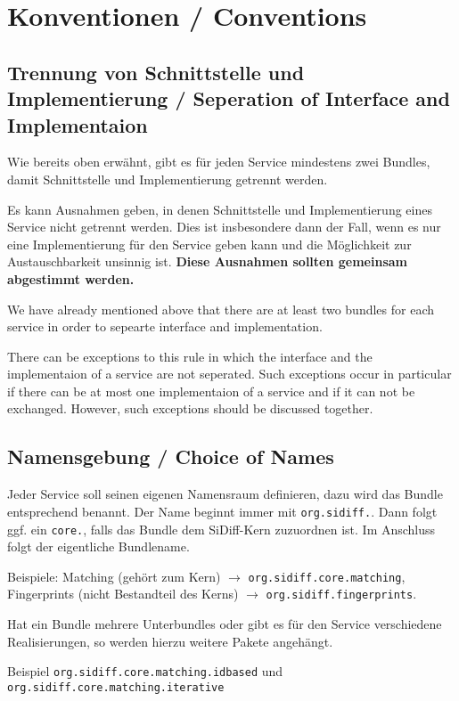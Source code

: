 \documentclass[10pt,a4paper]{scrartcl}
\providecommand{\deng}[2]{#1 / {\sffamily #2}}
\providecommand{\deutsch}[1]{#1}
\providecommand{\englisch}[1]{{\sffamily #1}}
\begin{document}
\clearpage
\section{\deng{Konventionen}{Conventions}}
\subsection{\deng{Trennung von Schnittstelle und Implementierung}{Seperation of Interface and Implementaion}}
\deutsch{Wie bereits oben erwähnt, gibt es für jeden Service mindestens zwei Bundles,
damit Schnittstelle und Implementierung getrennt werden.

Es kann Ausnahmen geben, in denen Schnittstelle und Implementierung eines Service
nicht getrennt werden. Dies ist insbesondere dann der Fall, wenn es nur eine 
Implementierung für den Service geben kann und die Möglichkeit zur Austauschbarkeit
unsinnig ist. \textbf{Diese Ausnahmen sollten gemeinsam abgestimmt werden.}}

\englisch{We have already mentioned above that there are at least two bundles
for each service in order to sepearte interface and implementation.

There can be exceptions to this rule in which the interface and the
implementaion of a service are not seperated. Such exceptions occur in
particular if there can be at most one implementaion of a service and if it can
not be exchanged. However, such exceptions should be discussed together.}


\subsection{\deng{Namensgebung}{Choice of Names}}
\deutsch{Jeder Service soll seinen eigenen Namensraum definieren, dazu wird das
Bundle entsprechend benannt. Der Name beginnt immer mit \texttt{org.sidiff.}.
Dann folgt ggf. ein \texttt{core.}, falls das Bundle dem SiDiff-Kern zuzuordnen
ist. Im Anschluss folgt der eigentliche Bundlename. 

Beispiele: Matching (gehört zum Kern) $\to$ \texttt{org.sidiff.core.matching},
Fingerprints (nicht Bestandteil des Kerns) $\to$
\texttt{org.sidiff.fingerprints}.

Hat ein Bundle mehrere Unterbundles oder gibt es für den Service verschiedene
Realisierungen, so werden hierzu weitere Pakete angehängt. 

Beispiel \texttt{org.sidiff.core.matching.idbased} und
\texttt{org.sidiff.core.matching.iterative}
}
\end{document}
